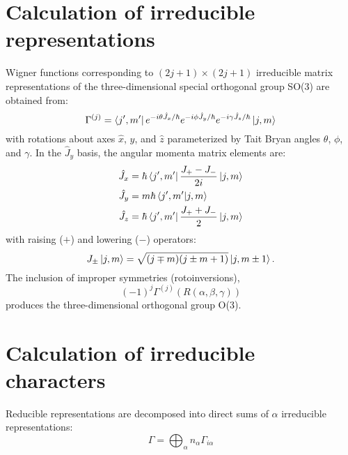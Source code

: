 \documentclass[preprint,showpacs,preprintnumbers,superscriptaddress,prb,floatfix,aps]{revtex4-1}
\begin{document}
\section{Calculation of irreducible representations}
Wigner functions corresponding to $(2j+1)\times(2j+1)$ irreducible matrix representations of the three-dimensional special orthogonal group SO(3) are obtained from:\cite{martin_electronic_2004}
\begin{equation}
\label{eq:imselfenergy}
\Gamma^{(j)} = \bra{j',m'} e^{-i\theta\hat{J}_x/\hbar} e^{-i\phi\hat{J}_y/\hbar} e^{-i\gamma\hat{J}_z/\hbar} \ket{j,m}
\end{equation}
with rotations about axes $\hat{x}$, $\hat{y}$, and $\hat{z}$ parameterized by Tait Bryan angles $\theta$, $\phi$, and $\gamma$. In the $\hat{J}_y$ basis, the angular momenta matrix elements are:\cite{shankar_fundamentals_2014}
\begin{align}
\label{eq:angular_momenta}
\hat{J}_x & = \hbar \bra{j',m'} \frac{J_{+}-J_{-}}{2i} \ket{j,m} \\
\hat{J}_y & = m \hbar \braket{j',m'}{j,m} \\
\hat{J}_z & = \hbar \bra{j',m'} \frac{J_{+}+J_{-}}{2} \ket{j,m}
\end{align}
with raising ($+$) and lowering ($-$) operators:
\begin{equation}
\label{eq:raising_lowering_operator}
J_{\pm}\ket{j,m} = \sqrt{(j\mp m)(j\pm m+1)}\ket{j,m\pm1}.
\end{equation}
The inclusion of improper symmetries (rotoinversions),
\begin{equation}
\label{eq:improper_rotation}
(-1)^{j} \Gamma^{(j)}(R\left(\alpha,\beta,\gamma\right))
\end{equation}
produces the three-dimensional orthogonal group O(3).\cite{el-batanouny_symmetry_2008}


%
%
%
\section{Calculation of irreducible characters}
Reducible representations are decomposed into direct sums of $\alpha$ irreducible representations:
\begin{equation}
\label{eq:irrep_decomposition}
\Gamma = \bigoplus_\alpha n_\alpha \Gamma_{i\alpha}
\end{equation}
\end{document}
